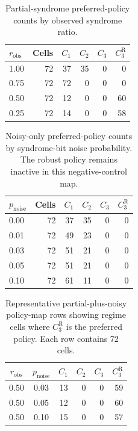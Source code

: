 \documentclass[11pt]{article}
\numberwithin{equation}{section}
\begin{document}
\begin{table}[ht]
\centering
\scriptsize
\caption{Partial-syndrome preferred-policy counts by observed syndrome ratio.}
\label{tab:supp-partial-by-robs}
\begin{tabular}{@{}lrrrrr@{}}
\toprule
$r_{\mathrm{obs}}$ & Cells & $C_1$ & $C_2$ & $C_3$ & $C_3^{\mathrm R}$ \\
\midrule
1.00 & 72 & 37 & 35 & 0 & 0 \\
0.75 & 72 & 72 & 0 & 0 & 0 \\
0.50 & 72 & 12 & 0 & 0 & 60 \\
0.25 & 72 & 14 & 0 & 0 & 58 \\
\bottomrule
\end{tabular}
\end{table}

\begin{table}[ht]
\centering
\scriptsize
\caption{Noisy-only preferred-policy counts by syndrome-bit noise probability.
The robust policy remains inactive in this negative-control map.}
\label{tab:supp-noisy-by-pnoise}
\begin{tabular}{@{}lrrrrr@{}}
\toprule
$p_{\mathrm{noise}}$ & Cells & $C_1$ & $C_2$ & $C_3$ & $C_3^{\mathrm R}$ \\
\midrule
0.00 & 72 & 37 & 35 & 0 & 0 \\
0.01 & 72 & 49 & 23 & 0 & 0 \\
0.03 & 72 & 51 & 21 & 0 & 0 \\
0.05 & 72 & 51 & 21 & 0 & 0 \\
0.10 & 72 & 61 & 11 & 0 & 0 \\
\bottomrule
\end{tabular}
\end{table}

\begin{table}[ht]
\centering
\scriptsize
\caption{Representative partial-plus-noisy policy-map rows showing regime cells
where $C_3^{\mathrm R}$ is the preferred policy. Each row contains 72 cells.}
\label{tab:supp-partial-noisy-active}
\begin{tabular}{@{}ccrrrr@{}}
\toprule
$r_{\mathrm{obs}}$ & $p_{\mathrm{noise}}$ & $C_1$ & $C_2$ & $C_3$ & $C_3^{\mathrm R}$ \\
\midrule
0.50 & 0.03 & 13 & 0 & 0 & 59 \\
0.50 & 0.05 & 12 & 0 & 0 & 60 \\
0.50 & 0.10 & 15 & 0 & 0 & 57 \\
\bottomrule
\end{tabular}
\end{table}
\end{document}
